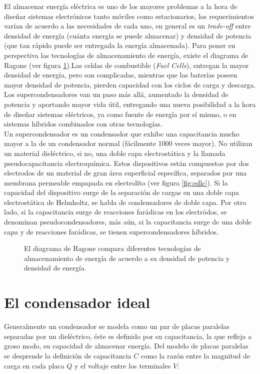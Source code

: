 El almacenar energía eléctrica es uno de los mayores problemas a la hora de diseñar sistemas electrónicos tanto móviles como estacionarios, los requerimientos varían de acuerdo a las necesidades de cada uno, en general es un \textit{trade-off} entre densidad de energía (cuánta energía se puede almacenar) y densidad de potencia (que tan rápido puede ser entregada la energía almacenada). Para poner en perspectiva las tecnologías de almacenamiento de energía, existe el diagrama de Ragone (ver figura \ref{fig:ragone}).Las celdas de combustible (\textit{Fuel Cells}), entregan la mayor densidad de energía, pero son complicadas, mientras que las baterías poseen mayor densidad de potencia, pierden capacidad con los ciclos de carga y descarga. Los supercondensadores van un paso más allá, aumentado la densidad de potencia y aportando mayor vida útil, entregando una nueva posibilidad a la hora de diseñar sistemas eléctricos, ya como fuente de energía por sí mismo, o en sistemas híbridos combinados con otras tecnologías\citep{Thounthong2009}.\\
Un supercondensador es un condensador que exhibe una capacitancia mucho mayor a la de un condensador normal (fácilmente 1000 veces mayor). No utilizan un material dieléctrico, si no, una doble capa electrostática y la llamada pseudocapacitancia electroquímica. Estos dispositivos están compuestos por dos electrodos de un material de gran área superficial específica, separados por una membrana permeable empapada en electrolíto (ver figura \ref{fig:edlc}). Si la capacidad del dispositivo surge de la separación de cargas en una doble capa electrostática de Helmholtz, se habla de condensadores de doble capa. Por otro lado, si la capacitancia surge de reacciones farádicas en los electródos, se denominan pseudocondensadores, más aún, si la capacitancia surge de una doble capa y de reacciones farádicas, se tienen supercondensadores híbridos.

\begin{figure}
	\centering
	\caption[Diagrama de Ragone]{El diagrama de Ragone compara diferentes tecnologías de almacenamiento de energía de acuerdo a su densidad de potencia y densidad de energía.}
	\label{fig:ragone}
\end{figure}

\section{El condensador ideal}
Generalmente un condensador se modela como un par de placas paralelas separadas por un dieléctrico, éste es definido por su capacitancia, la que refleja a groso modo, su capacidad de almacenar energía. Del modelo de placas paralelas se desprende la definición de capacitancia $C$ como la razón entre la magnitud de carga en cada placa $Q$ y el voltaje entre los terminales $V$:


